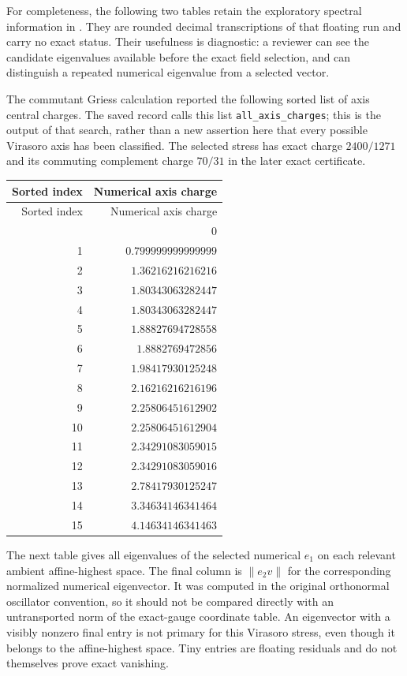 For completeness, the following two tables retain the exploratory
spectral information in
.
They are rounded decimal transcriptions of that floating run and carry
no exact status. Their usefulness is diagnostic: a reviewer can see the
candidate eigenvalues available before the exact field selection, and
can distinguish a repeated numerical eigenvalue from a selected vector.

The commutant Griess calculation reported the following sorted list of
axis central charges. The saved record calls this list
\texttt{all\_axis\_charges}; this is the output of that search, rather
than a new assertion here that every possible Virasoro axis has been
classified. The selected stress has exact charge $2400/1271$ and its
commuting complement charge $70/31$ in the later exact certificate.

\begin{longtable}{@{}rr@{}}
\toprule Sorted index&Numerical axis charge\\\midrule\endfirsthead
\toprule Sorted index&Numerical axis charge\\\midrule\endhead
\bottomrule\endfoot
0 & $0$\\
1 & $0.799999999999999$\\
2 & $1.36216216216216$\\
3 & $1.80343063282447$\\
4 & $1.80343063282447$\\
5 & $1.88827694728558$\\
6 & $1.8882769472856$\\
7 & $1.98417930125248$\\
8 & $2.16216216216196$\\
9 & $2.25806451612902$\\
10 & $2.25806451612904$\\
11 & $2.34291083059015$\\
12 & $2.34291083059016$\\
13 & $2.78417930125247$\\
14 & $3.34634146341464$\\
15 & $4.14634146341463$\\
\end{longtable}
The next table gives all eigenvalues of the selected numerical
$e_1$ on each relevant ambient affine-highest space. The final column
is $\|e_2v\|$ for the corresponding normalized numerical eigenvector.
It was computed in the original orthonormal oscillator convention, so
it should not be compared directly with an untransported norm of the
exact-gauge coordinate table. An eigenvector with a visibly nonzero
final entry is not primary for this Virasoro stress, even though it
belongs to the affine-highest space. Tiny entries are floating residuals
and do not themselves prove exact vanishing.

